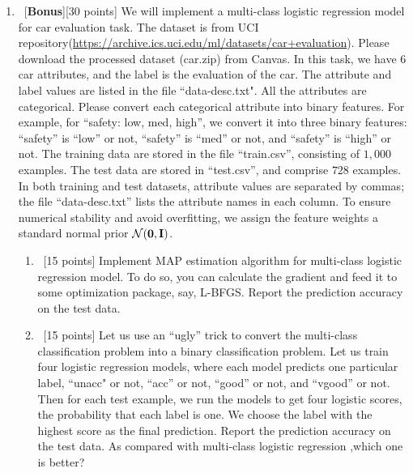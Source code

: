\documentclass[12pt, fullpage,letterpaper]{article}
\begin{document}
\begin{enumerate}
	
	\item~[\textbf{Bonus}][30 points]  We will implement a multi-class logistic regression model for car evaluation task. The dataset is from UCI repository(\url{https://archive.ics.uci.edu/ml/datasets/car+evaluation}). Please download the processed dataset (car.zip) from Canvas.  In this task, we have $6$ car attributes, and the label is the evaluation of the car. The attribute and label values are listed in the file ``data-desc.txt". All the attributes are categorical. Please convert each categorical attribute into binary features. For example, for ``safety: low, med, high'', we convert it into three binary features: ``safety'' is ``low'' or not, ``safety'' is ``med'' or not, and ``safety'' is  ``high'' or not. 
	The training data are stored in the file ``train.csv'', consisting of $1,000$ examples. The test data are stored in ``test.csv'', and comprise $728$ examples. In both training and test datasets, attribute values are separated by commas; the file ``data-desc.txt''  lists the attribute names in each column.  To ensure numerical stability and avoid overfitting, we assign the feature weights a standard normal prior $\mathcal{N}({\bf 0}, {\bf I})$.  
	\begin{enumerate}
		\item~[15 points] Implement MAP estimation algorithm for multi-class logistic regression model. To do so, you can calculate the gradient and feed it to some optimization package, say, L-BFGS. Report the prediction accuracy on the test data.
		\item~[15 points] Let us use an ``ugly'' trick to convert the multi-class classification problem into a binary classification problem.
		Let us train four logistic regression models, where each model predicts one particular label, \ie ``unacc" or not, ``acc'' or not, ``good'' or not, and ``vgood'' or not. Then for each test example, we run the models to get four logistic scores, \ie the probability that each label is one. We choose the label with the  highest score as the final prediction. Report the prediction accuracy on the test data. As compared with multi-class logistic regression ,which one is better? 
	\end{enumerate}
	
	
	

	
\end{enumerate}
\end{document}
